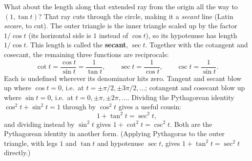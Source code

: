 What about the length along that extended ray from the origin all the way to $(1,\tan t)$? That ray cuts through the circle, making it a \emph{secant} line (Latin \emph{secare}, to cut). The outer triangle is the inner triangle scaled up by the factor $1/\cos t$ (its horizontal side is $1$ instead of $\cos t$), so its hypotenuse has length $1/\cos t$. This length is called the \textbf{secant}, $\sec t$. Together with the cotangent and cosecant, the remaining three functions are reciprocals:
\[
  \cot t = \frac{\cos t}{\sin t} = \frac{1}{\tan t},\qquad
  \sec t = \frac{1}{\cos t},\qquad
  \csc t = \frac{1}{\sin t}.
\]
Each is undefined wherever its denominator hits zero. Tangent and secant blow up where $\cos t = 0$, i.e.\ at $t = \pm\pi/2, \pm 3\pi/2,\ldots$; cotangent and cosecant blow up where $\sin t = 0$, i.e.\ at $t = 0, \pm\pi, \pm 2\pi,\ldots$. Dividing the Pythagorean identity $\cos^2 t + \sin^2 t = 1$ through by $\cos^2 t$ gives a useful cousin:
\[
  1 + \tan^2 t = \sec^2 t,
\]
and dividing instead by $\sin^2 t$ gives $1 + \cot^2 t = \csc^2 t$. Both are the Pythagorean identity in another form. (Applying Pythagoras to the outer triangle, with legs $1$ and $\tan t$ and hypotenuse $\sec t$, gives $1 + \tan^2 t = \sec^2 t$ directly.)


